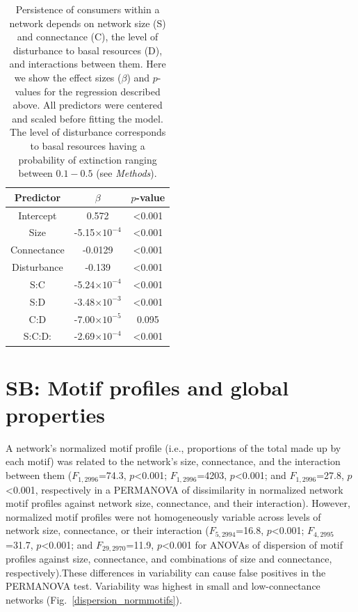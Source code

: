 \documentclass[12pt]{article}
\begin{document}
\begin{spacing}{2.0}
    \begin{table}[hb!]
        \caption{Persistence of consumers within a network depends on network size (S) and connectance (C), the level of disturbance to basal resources (D), and interactions between them. Here we show the effect sizes ($\beta$) and $p$-values for the regression described above. All predictors were centered and scaled before fitting the model. The level of disturbance corresponds to basal resources having a probability of extinction ranging between $0.1 - 0.5$ (see \emph{Methods}).
        }
        \label{tab:per_vs_SC}
        \centering
        \begin{tabular}{c|c c |}
            Predictor & $\beta$ & $p$-value \\
            \hline
            Intercept & 0.572 & \textless0.001 \\
            Size & -5.15$\times10^{-4}$  & \textless0.001 \\
            Connectance & -0.0129 & \textless0.001 \\
            Disturbance & -0.139 & \textless0.001 \\
            S:C & -5.24$\times10^{-4}$ & \textless0.001 \\
            S:D & -3.48$\times10^{-3}$ & \textless0.001 \\
            C:D & -7.00$\times10^{-5}$ & 0.095 \\
            S:C:D: & -2.69$\times10^{-4}$ & \textless0.001 \\
        \end{tabular}
    \end{table}

\clearpage


\section{SB: Motif profiles and global properties}


    A network's normalized motif profile (i.e., proportions of the total made up by each motif) was related to the network's size, connectance, and the interaction between them ($F_{1,2996}$=74.3, $p$\textless0.001; $F_{1,2996}$=4203, $p$\textless0.001; and $F_{1,2996}$=27.8, $p$\textless0.001, respectively in a PERMANOVA of dissimilarity in normalized network motif profiles against network size, connectance, and their interaction).
    However, normalized motif profiles were not homogeneously variable across levels of network size, connectance, or their interaction  ($F_{5,2994}$=16.8, $p$\textless0.001; $F_{4,2995}$=31.7, $p$\textless0.001; and $F_{29,2970}$=11.9, $p$\textless0.001 for ANOVAs of dispersion of motif profiles against size, connectance, and combinations of size and connectance, respectively).These differences in variability can cause false positives in the PERMANOVA test. Variability was highest in small and low-connectance networks (Fig.~\ref{dispersion_normmotifs}).



\end{spacing}
\end{document}
